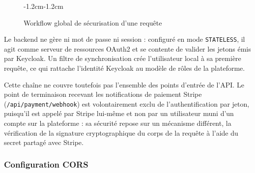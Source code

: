 \begin{figure}[H]
\begin{adjustwidth}{-1.2cm}{-1.2cm}
\caption{Workflow global de sécurisation d'une requête}
\label{fig:workflow-securite}
\end{adjustwidth}
\end{figure}

Le backend ne gère ni mot de passe ni session : configuré en mode \texttt{STATELESS}, il agit comme serveur de ressources OAuth2 et se contente de valider les jetons émis par Keycloak. Un filtre de synchronisation crée l'utilisateur local à sa première requête, ce qui rattache l'identité Keycloak au modèle de rôles de la plateforme.

Cette chaîne ne couvre toutefois pas l'ensemble des points d'entrée de l'API. Le point de terminaison recevant les notifications de paiement Stripe (\texttt{/api/payment/webhook}) est volontairement exclu de l'authentification par jeton, puisqu'il est appelé par Stripe lui-même et non par un utilisateur muni d'un compte sur la plateforme : sa sécurité repose sur un mécanisme différent, la vérification de la signature cryptographique du corps de la requête à l'aide du secret partagé avec Stripe.

\subsubsection{Configuration CORS}

